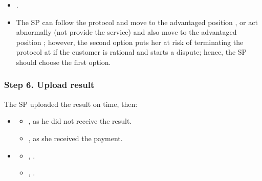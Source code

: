 \Fairness
\newcommand{\SPCanDoBothButFollowIsSafe}[1]{The SP can follow the protocol and move to the advantaged position \Pos{#1}{s}{\normal}{\plus}, or act abnormally (not provide the service) and also move to the advantaged position \Pos{#1}{s}{\abnormal}{\plus}; however, the second option puts her at risk of terminating the protocol at \Pos{#1}{s}{\abdispute}{\minus} if the customer is rational and starts a dispute; hence, the SP should choose the first option}

\begin{itemize}
  \item {}.
  \item \SPCanDoBothButFollowIsSafe{5}.
\end{itemize}

\subsubsection*{Step 6. \SPTurn{} Upload result}\label{step-6-publication-of-results}

The SP uploaded the result on time, then:

\begin{itemize}
\item \AgreeablePath
  \begin{itemize}
    \item {},  as he did not receive the result.
    \item {},  as she received the payment.
  \end{itemize}
\item \DisputePath
  \begin{itemize}
    \item {}, \CustomerLosesBeforePoP{}.
    \item {}, .

  \end{itemize}
\end{itemize}

\ActedAbnormallyThen{\sp}

